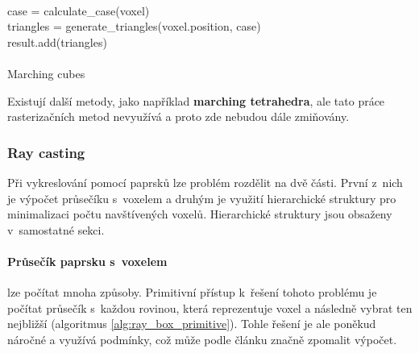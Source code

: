 \begin{center}
	\begin{czechalgorithm}[H] \label{alg:marching_cubes}
		 {\\
			case = calculate\_case(voxel)\\
			triangles = generate\_triangles(voxel.position, case)\\
			result.add(triangles)\\
		}\\
		\caption{Marching cubes}
	\end{czechalgorithm}
\end{center}

Existují další metody, jako například \textbf{marching tetrahedra}, ale tato práce rasterizačních metod nevyužívá a proto zde nebudou dále zmiňovány.

\subsubsection{Ray casting} \label{sec:voxel_intersection}
Při vykreslování pomocí paprsků lze problém rozdělit na dvě části. První z~nich je výpočet průsečíku s~voxelem a druhým je využití hierarchické struktury pro minimalizaci počtu navštívených voxelů. Hierarchické struktury jsou obsaženy v~samostatné sekci.

\paragraph{Průsečík paprsku s~voxelem} lze počítat mnoha způsoby. Primitivní přístup k~řešení tohoto problému je počítat průsečík s~každou rovinou, která reprezentuje voxel a následně vybrat ten nejbližší (algoritmus \ref{alg:ray_box_primitive}). Tohle řešení je ale poněkud náročné a využívá podmínky, což může podle článku \cite{gpu_branch} značně zpomalit výpočet.

